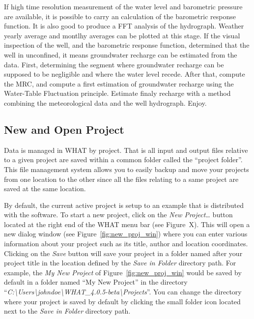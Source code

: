 \documentclass[12pt, letterpaper, fleqn]{report}
\begin{document}
If high time resolution measurement of the water level and barometric pressure are available, it is possible to carry an calculation of the barometric response function. It is also good to produce a FFT analysis of the hydrograph.
Weather yearly average and montlhy averages can be plotted at this stage.
If the visual inspection of the well, and the barometric response function, determined that the well in unconfined, it means groundwater recharge can be estimated from the data. First, determining the segment where groundwater recharge can be supposed to be negligible and where the water level recede. After that, compute the MRC, and compute a first estimation of groundwater recharge using the Water-Table Fluctuation principle. Estimate finaly recharge with a method combining the meteorological data and the well hydrograph. Enjoy.

\subsection{New and Open Project}

Data is managed in WHAT by project. That is all input and output files relative to a given project are saved within a common folder called the ``project folder''. This file management system allows you to easily backup and move your projects from one location to the other since all the files relating to a same project are saved at the same location.

By default, the current active project is setup to an example that is distributed with the software. To start a new project, click on the \textsl{New Project\dots} button located at the right end of the WHAT menu bar (see Figure~X). This will open a new dialog window (see Figure~\ref{fig:new_proj_win}) where you can enter various information about your project such as its title, author and location coordinates. Clicking on the \textsl{Save} button will save your project in a folder named after your project title in the location defined by the \textsl{Save in Folder} directory path. For example, the \textsl{My New Project} of Figure~\ref{fig:new_proj_win} would be saved by default in a folder named ``My New Project'' in the directory ``\textsl{C:\textbackslash{}Users\textbackslash{}johndoe\textbackslash{}WHAT\_4.0.5-beta\textbackslash{}Projects}''. You can change the directory where your project is saved by default by clicking the small folder icon located next to the \textsl{Save in Folder} directory path.

\end{document}
